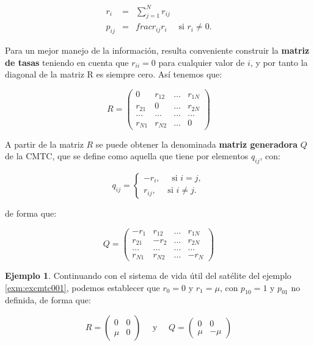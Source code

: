 \documentclass[
]{book}
\theoremstyle{definition}
\theoremstyle{definition}
\newtheorem{example}{Ejemplo}[chapter]
\theoremstyle{definition}
\theoremstyle{definition}
\theoremstyle{remark}
\begin{document}
\begin{eqnarray*}
r_i &=& \sum_{j=1}^{N} r_{ij}\\
p_{ij}&=&frac{r_{ij}}{r_i} \quad \text{ si } r_i \neq 0.
\end{eqnarray*}

Para un mejor manejo de la información, resulta conveniente construir la \textbf{matriz de tasas} teniendo en cuenta que \(r_{ii} = 0\) para cualquier valor de \(i\), y por tanto la diagonal de la matriz R es siempre cero. Así tenemos que:

\[R = 
\begin{pmatrix}
0 & r_{12} & ... & r_{1N}\\
r_{21} & 0 & ... & r_{2N}\\
... & ... & ... & ...\\
r_{N1} & r_{N2} & ... & 0
\end{pmatrix}\]

A partir de la matriz \(R\) se puede obtener la denominada \textbf{matriz generadora} \(Q\) de la CMTC, que se define como aquella que tiene por elementos \(q_{ij}\), con:

\[q_{ij} = \begin{cases}
-r_i, \quad \text{ si } i = j, \\
r_{ij}, \quad \text{ si } i \neq j.
\end{cases}\]

de forma que:

\[Q = 
\begin{pmatrix}
-r_1 & r_{12} & ... & r_{1N}\\
r_{21} & -r_2 & ... & r_{2N}\\
... & ... & ... & ...\\
r_{N1} & r_{N2} & ... & -r_N
\end{pmatrix}\]

\begin{example}
\protect\hypertarget{exm:excmtc003}{}\label{exm:excmtc003}Continuando con el sistema de vida útil del satélite del ejemplo \ref{exm:excmtc001}, podemos establecer que \(r_0 = 0\) y \(r_1 = \mu\), con \(p_{10} = 1\) y \(p_{01}\) no definida, de forma que:
\end{example}

\[R = 
\begin{pmatrix}
0 & 0 \\
\mu & 0
\end{pmatrix} \quad \text{ y } \quad Q = 
\begin{pmatrix}
0 & 0 \\
\mu & -\mu
\end{pmatrix}\]
\end{document}
